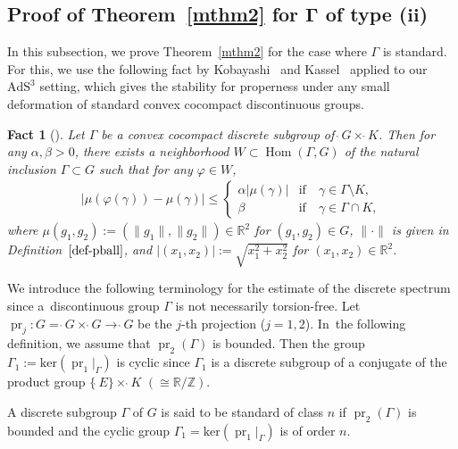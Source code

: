 \documentclass[pdftex]{sigma}
\numberwithin{equation}{section}
\newtheorem{Fact}[Theorem]{Fact}
 { \theoremstyle{definition}
\newtheorem{Definition}[Theorem]{Definition}
\newtheorem{Note}[Theorem]{Note}
\newtheorem{Example}[Theorem]{Example}
\newtheorem{Remark}[Theorem]{Remark}
\newtheorem{Setting}[Theorem]{Setting}
\newtheorem{Notation}[Theorem]{Notation}
}
\begin{document}
\subsection[Proof of Theorem~1.4 for Gamma of type (ii)]
{Proof of Theorem~\ref{mthm2} for $\boldsymbol\Gamma$ of type ($\boldsymbol {ii}$)}

In this subsection, we prove Theorem~\ref{mthm2} for the case
where $\Gamma$ is standard.
For this, we use the following fact by Kobayashi~\cite{Kob98} and Kassel~\cite{Ka12}
applied to our $\mathrm{AdS}^{3}$ setting, which gives the stability for properness
under any small deformation of standard convex cocompact discontinuous groups.
\begin{Fact}[{\cite[Theorem~1.4]{Ka12}}]
\label{deform}
Let $\Gamma$ be a convex cocompact discrete subgroup of $\grave{\ }G \times \grave{\ }K$.
Then for any $\alpha,\beta>0$,
there exists a neighborhood $W\subset\operatorname{Hom}(\Gamma,G)$
of the natural inclusion $\Gamma \subset G$ such that
for any $\varphi\in W$,
\begin{align*}
\left|\mu(\varphi(\gamma))-\mu(\gamma)\right|\leq
\begin{cases}
\alpha\left|\mu(\gamma)\right|&\text{if}\quad\gamma \in \Gamma\setminus K,\\
\beta&\text{if}\quad\gamma \in \Gamma\cap K,
\end{cases}
\end{align*}
where $\mu(g_{1},g_{2}):=(\|g_{1}\|,\|g_{2}\|)\in\mathbb{R}^{2}$ for $(g_{1},g_{2})\in G$,
$\|\cdot\|$ is given in Definition~$\ref{def-pball}$,
and $\left|(x_1,x_2)\right|:=\sqrt{x_{1}^{2} + x_{2}^{2}}$ for $(x_{1},x_{2})\in\mathbb{R}^2$.
\end{Fact}

We introduce the following terminology for the estimate of the discrete spectrum
since a~discontinuous group $\Gamma$ is not necessarily torsion-free.
Let $\operatorname{pr}_{j}\colon G=\grave{\ }G\times\grave{\ }G
\rightarrow \grave{\ }G$
be the $j$-th projection ($j=1,2$). In~the following definition, we assume that $\operatorname{pr}_{2}(\Gamma)$ is bounded.
Then the group $\Gamma_1:=\mathrm{ker}(\operatorname{pr}_{1}|_{\Gamma})$ is cyclic
since $\Gamma_1$ is a discrete subgroup of a conjugate of the product group
$\{\grave{\ }E\}\times\grave{\ }K$ $(\cong \mathbb{R}/\mathbb{Z})$.


\begin{Definition}
\label{classn}
A discrete subgroup $\Gamma$ of $G$ is said to be standard of class $n$
if $\operatorname{pr}_{2}(\Gamma)$ is bounded and
the cyclic group $\Gamma_1=\mathrm{ker}(\operatorname{pr}_{1}|_{\Gamma})$
is of order $n$.
\end{Definition}
\end{document}
